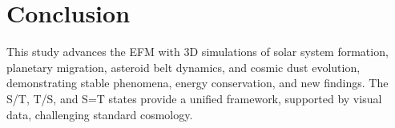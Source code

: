 \documentclass[11pt]{article}
\begin{document}
\section{Conclusion}
This study advances the EFM with 3D simulations of solar system formation, planetary migration, asteroid belt dynamics, and cosmic dust evolution, demonstrating stable phenomena, energy conservation, and new findings. The S/T, T/S, and S=T states provide a unified framework, supported by visual data, challenging standard cosmology.
\end{document}
